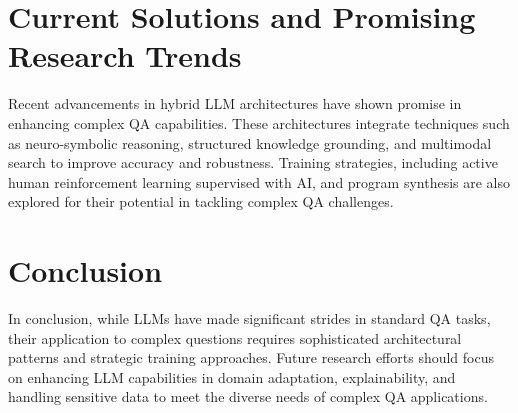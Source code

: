 \documentclass{article}
\begin{document}
\section{Current Solutions and Promising Research Trends}
Recent advancements in hybrid LLM architectures have shown promise in enhancing complex QA capabilities. These architectures integrate techniques such as neuro-symbolic reasoning, structured knowledge grounding, and multimodal search to improve accuracy and robustness. Training strategies, including active human reinforcement learning supervised with AI, and program synthesis are also explored for their potential in tackling complex QA challenges.

\section{Conclusion}
In conclusion, while LLMs have made significant strides in standard QA tasks, their application to complex questions requires sophisticated architectural patterns and strategic training approaches. Future research efforts should focus on enhancing LLM capabilities in domain adaptation, explainability, and handling sensitive data to meet the diverse needs of complex QA applications.


 
\end{document}
